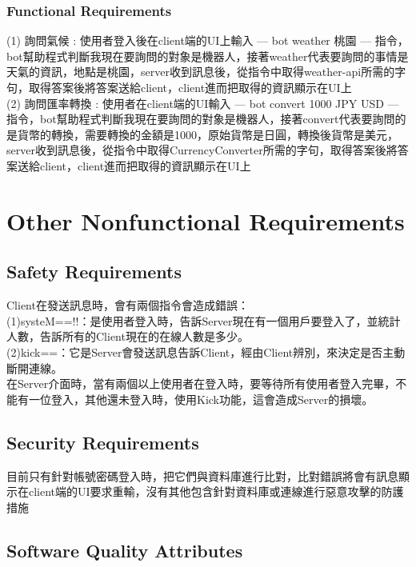 \documentclass{scrreprt}
\begin{document}
\begin{CJK}{UTF8}{bkai}
\subsection{Functional Requirements}
(1) 詢問氣候 : 使用者登入後在client端的UI上輸入 --- bot weather 桃園 --- 指令，bot幫助程式判斷我現在要詢問的對象是機器人，接著weather代表要詢問的事情是天氣的資訊，地點是桃園，server收到訊息後，從指令中取得weather-api所需的字句，取得答案後將答案送給client，client進而把取得的資訊顯示在UI上\\
(2) 詢問匯率轉換 : 使用者在client端的UI輸入 ---  bot convert 1000 JPY USD --- 指令，bot幫助程式判斷我現在要詢問的對象是機器人，接著convert代表要詢問的是貨幣的轉換，需要轉換的金額是1000，原始貨幣是日圓，轉換後貨幣是美元，server收到訊息後，從指令中取得CurrencyConverter所需的字句，取得答案後將答案送給client，client進而把取得的資訊顯示在UI上\\



\chapter{Other Nonfunctional Requirements}


\section{Safety Requirements}
Client在發送訊息時，會有兩個指令會造成錯誤：\\
(1)systeM==!!：是使用者登入時，告訴Server現在有一個用戶要登入了，並統計人數，告訴所有的Client現在的在線人數是多少。\\
(2)kick==：它是Server會發送訊息告訴Client，經由Client辨別，來決定是否主動斷開連線。\\
在Server介面時，當有兩個以上使用者在登入時，要等待所有使用者登入完畢，不能有一位登入，其他還未登入時，使用Kick功能，這會造成Server的損壞。\\


\section{Security Requirements}
目前只有針對帳號密碼登入時，把它們與資料庫進行比對，比對錯誤將會有訊息顯示在client端的UI要求重輸，沒有其他包含針對資料庫或連線進行惡意攻擊的防護措施

\section{Software Quality Attributes}


\end{CJK}
\end{document}
